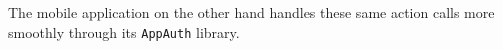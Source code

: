 The mobile application on the other hand handles these same action calls more smoothly through its \texttt{AppAuth} library.








